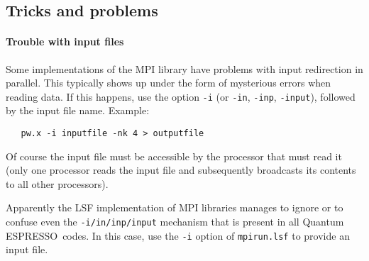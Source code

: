 \documentclass[12pt,a4paper]{article}
\def\qe{{\sc Quantum ESPRESSO}}
\begin{document}
\subsection{Tricks and problems}

\paragraph{Trouble with input files}
Some implementations of the MPI library have problems with input 
redirection in parallel. This typically shows up under the form of
mysterious errors when reading data. If this happens, use the option 
\texttt{-i} (or \texttt{-in}, \texttt{-inp}, \texttt{-input}), 
followed by the input file name. 
Example:
\begin{verbatim}
   pw.x -i inputfile -nk 4 > outputfile
\end{verbatim} 
Of course the 
input file must be accessible by the processor that must read it
(only one processor reads the input file and subsequently broadcasts
its contents to all other processors).

Apparently the LSF implementation of MPI libraries manages to ignore or to
confuse even the \texttt{-i/in/inp/input} mechanism that is present in all
\qe\ codes. In this case, use the \texttt{-i} option of \texttt{mpirun.lsf}
to provide an input file.
\end{document}
